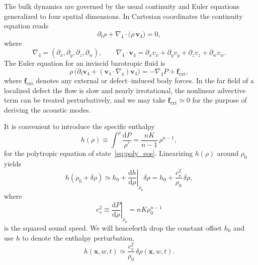 \documentclass[12pt]{article}
\begin{document}
The bulk dynamics are governed by the usual continuity and Euler equations
generalized to four spatial dimensions.  In Cartesian coordinates the
continuity equation reads
\begin{equation}
  \partial_t \rho
  + \nabla_4 \cdot \big(\rho\,\mathbf{v}_4\big)
  = 0,
  \label{eq:bulk_continuity}
\end{equation}
where
\begin{equation}
  \nabla_4 = (\partial_x,\partial_y,\partial_z,\partial_w),
  \qquad
  \nabla_4\cdot\mathbf{v}_4
  = \partial_x v_x + \partial_y v_y + \partial_z v_z + \partial_w v_w.
\end{equation}
The Euler equation for an inviscid barotropic fluid is
\begin{equation}
  \rho\,\Big(\partial_t \mathbf{v}_4
  + (\mathbf{v}_4\cdot\nabla_4)\mathbf{v}_4\Big)
  = - \nabla_4 P + \mathbf{f}_{\mathrm{ext}},
  \label{eq:bulk_euler}
\end{equation}
where $\mathbf{f}_{\mathrm{ext}}$ denotes any external or defect--induced
body forces.  In the far field of a localized defect the flow is slow and
nearly irrotational, the nonlinear advective term can be treated
perturbatively, and we may take $\mathbf{f}_{\mathrm{ext}}\simeq 0$ for the
purpose of deriving the acoustic modes.

It is convenient to introduce the specific enthalpy
\begin{equation}
  h(\rho)
  \equiv \int^{\rho} \frac{\mathrm{d}P}{\rho'}
  = \frac{nK}{n-1}\,\rho^{n-1},
  \label{eq:enthalpy_def}
\end{equation}
for the polytropic equation of state~\eqref{eq:poly_eos}.  Linearizing
$h(\rho)$ around $\rho_0$ yields
\begin{equation}
  h(\rho_0 + \delta\rho)
  \simeq h_0
  + \left.\frac{\mathrm{d}h}{\mathrm{d}\rho}\right|_{\rho_0}\delta\rho
  = h_0 + \frac{c_s^2}{\rho_0}\,\delta\rho,
\end{equation}
where
\begin{equation}
  c_s^2
  \equiv \left.\frac{\mathrm{d}P}{\mathrm{d}\rho}\right|_{\rho_0}
  = nK\rho_0^{n-1}
\end{equation}
is the squared sound speed.  We will henceforth drop the constant offset
$h_0$ and use $h$ to denote the enthalpy perturbation,
\begin{equation}
  h(\mathbf{x},w,t)
  \simeq \frac{c_s^2}{\rho_0}\,\delta\rho(\mathbf{x},w,t).
  \label{eq:enthalpy_perturbation}
\end{equation}
\end{document}
